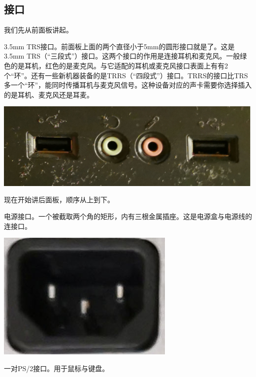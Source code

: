 \subsection{接口}
我们先从前面板讲起。\par
3.5mm TRS接口。前面板上面的两个直径小于5mm的圆形接口就是了。这是3.5mm TRS（“三段式”）接口。这两个接口的作用是连接耳机和麦克风。一般绿色的是耳机，红色的是麦克风。与它适配的耳机或麦克风接口表面上有有2个“环”。还有一些新机器装备的是TRRS（“四段式”）接口。TRRS的接口比TRS多一个“环”，能同时传播耳机与麦克风信号。这种设备对应的声卡需要你选择插入的是耳机、麦克风还是耳麦。
\begin{center}
	\includegraphics[scale=0.06]{pic/Box1}
\end{center}\par
现在开始讲后面板，顺序从上到下。\par
电源接口。一个被截取两个角的矩形，内有三根金属插座。这是电源盒与电源线的连接口。
\begin{center}
	\includegraphics[scale=0.3]{pic/Power}
\end{center}\par
一对PS/2接口。用于鼠标与键盘。
